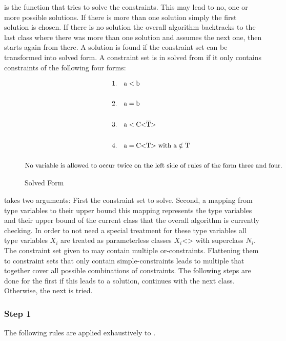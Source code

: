  is the function that tries to solve the constraints. This may lead to no, one or more possible solutions. If there is more than one solution simply the first solution is chosen. If there is no solution the overall algorithm backtracks to the last class where there was more than one solution and assumes the next one, then starts again from there.
A solution is found if the constraint set can be transformed into solved form. A constraint set is in solved from if it only contains constraints of the following four forms:

\begin{figure}[H]
    \begin{align*}
        1.& \quad \text{a} < \text{b}\\
        \\
        2.& \quad \text{a} = \text{b}\\
        \\
        3.& \quad \text{a} < \text{C<} \ot{T} \text{>}\\
        \\
        4.& \quad \text{a} = \text{C<} \ot{T} \text{>} \ \text{with a} \notin \ot{T}\\
        \\
        \text{No variable is allowed to occur } & \text{twice on the left side of rules of the form three and four.}
    \end{align*}
    \caption{Solved Form}
    \label{solved_form}
\end{figure}

 takes two arguments: First the constraint set to solve. Second, a mapping from type variables  to their upper bound  this mapping represents the type variables and their upper bound of the current class that the overall algorithm is currently checking.
In order to not need a special treatment for these type variables all type variables $X_i$ are treated as parameterless classes $X_i$<> with superclass $N_i$.
The constraint set  given to  may contain multiple or-constraints. Flattening them to constraint sets  that only contain simple-constraints leads to multiple  that together cover all possible combinations of constraints.
The following steps are done for the first  if this leads to a solution,  continues with the next class. Otherwise, the next  is tried.

\subsubsection{Step 1}
The following rules are applied exhaustively to .

